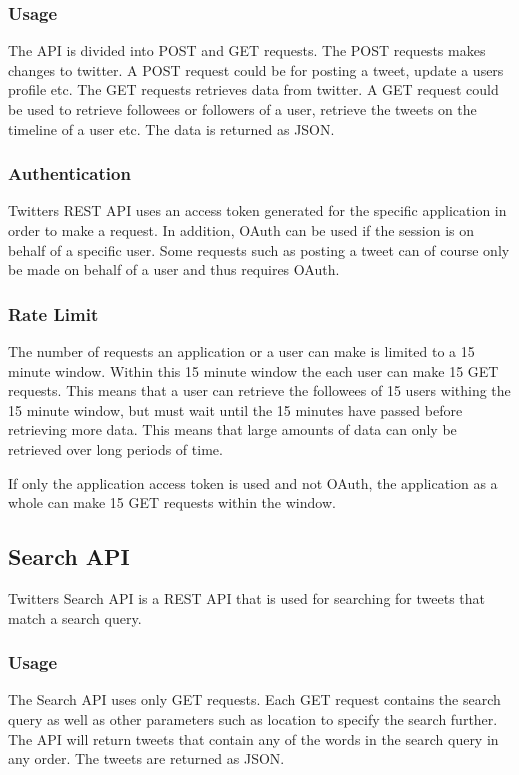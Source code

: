 \subsubsection{Usage}
The API is divided into POST and GET requests. The POST requests makes changes to twitter. A POST request could be for posting a tweet, update a users profile etc. The GET requests retrieves data from twitter. A GET request could be used to retrieve followees or followers of a user, retrieve the tweets on the timeline of a user etc. The data is returned as JSON. \cite{twitter-rest-api}

\subsubsection{Authentication}
Twitters REST API uses an access token generated for the specific application in order to make a request. In addition, OAuth can be used if the session is on behalf of a specific user. Some requests such as posting a tweet can of course only be made on behalf of a user and thus requires OAuth. \cite{twitter-rest-api}

\subsubsection{Rate Limit}
The number of requests an application or a user can make is limited to a 15 minute window. Within this 15 minute window the each user can make 15 GET requests. This means that a user can retrieve the followees of 15 users withing the 15 minute window, but must wait until the 15 minutes have passed before retrieving more data. This means that large amounts of data can only be retrieved over long periods of time.

If only the application access token is used and not OAuth, the application as a whole can make 15 GET requests within the window. \cite{twitter-rate-limiting}

\subsection{Search API}\label{sec:pre-twitter-search}
Twitters Search API is a REST API that is used for searching for tweets that match a search query.

\subsubsection{Usage}
The Search API uses only GET requests. Each GET request contains the search query as well as other parameters such as location to specify the search further. The API will return tweets that contain any of the words in the search query in any order. The tweets are returned as JSON.\cite{twitter-rest-api}

